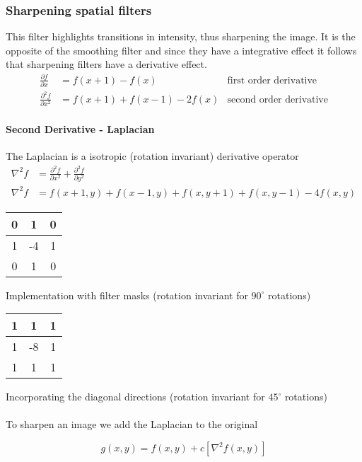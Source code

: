 \subsubsection{Sharpening spatial filters }
This filter highlights transitions in intensity, thus sharpening the image.
It is the opposite of the smoothing filter and since they have a integrative effect it follows that sharpening filters have a derivative effect.
\begin{align}
\frac{\partial f}{\partial x} &= f(x+1) - f(x)& \text{first order derivative} \\
\frac{\partial^2 f}{\partial x^2} &= f(x+1) + f(x-1)  -2 f(x)& \text{second order derivative}
\end{align}

\paragraph{Second Derivative - Laplacian}
The Laplacian is a isotropic (rotation invariant) derivative operator
\begin{align}
\nabla^2f &= \frac{\partial^2 f}{\partial x^2} + \frac{\partial^2 f}{\partial y^2} \\
\nabla^2f &= f(x+1,y) + f(x-1,y) + f(x,y+1) + f(x,y-1) - 4 f(x,y)
\end{align}

\begin{tabular}{|c|c|c|} \hline
0 & 1 & 0  \\ \hline
1 &-4 & 1  \\ \hline
0 & 1 & 0  \\ \hline
\end{tabular}
Implementation with filter masks (rotation invariant for $90^\circ$ rotations)

\begin{tabular}{|c|c|c|} \hline
1 & 1 & 1 \\ \hline
1 &-8 & 1 \\ \hline
1 & 1 & 1 \\ \hline
\end{tabular}
Incorporating the diagonal directions (rotation invariant for $45^\circ$ rotations)
\\ \\
To sharpen an image we add the Laplacian to the original

\begin{equation}
g(x,y) = f(x,y) + c \left[ \nabla^2f(x,y) \right]
\end{equation}

